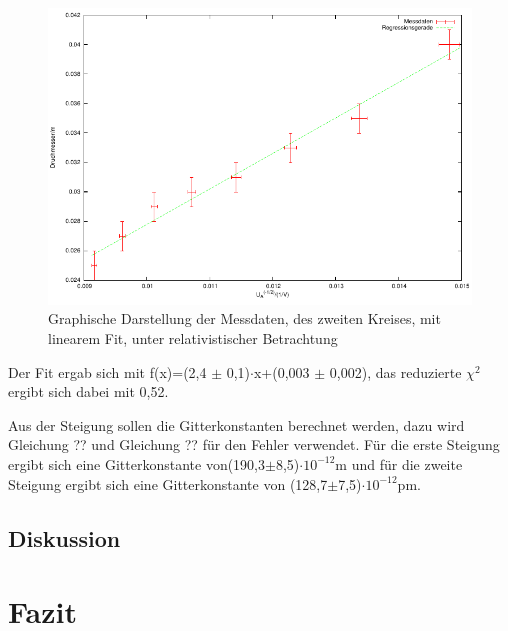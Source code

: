 \documentclass[12pt,a4paper]{article}
\begin{document}
\begin{figure}[H] 
  \centering
    \includegraphics[scale = 1]{kreis_2_r.pdf}
  	\caption[Graphische Darstellung der Messdaten, des zweiten Kreises, mit linearem Fit, unter relativistischer Betrachtung]{Graphische Darstellung der Messdaten, des zweiten Kreises, mit linearem Fit, unter relativistischer Betrachtung}
  \label{fig:plot_1}
\end{figure}

Der Fit ergab sich mit f(x)=(2,4 $\pm$ 0,1)$\cdot$x+(0,003 $\pm$ 0,002), das reduzierte $\chi^2$ ergibt sich dabei mit 0,52.

Aus der Steigung sollen die Gitterkonstanten berechnet werden, dazu wird Gleichung ?? und Gleichung ?? für den Fehler verwendet. Für die erste Steigung ergibt sich eine Gitterkonstante von(190,3$\pm$8,5)$\cdot 10^{-12}$m und für die zweite Steigung ergibt sich eine Gitterkonstante von (128,7$\pm$7,5)$\cdot 10^{-12}$pm.

\subsection{Diskussion}
\section{Fazit}
\end{document}
